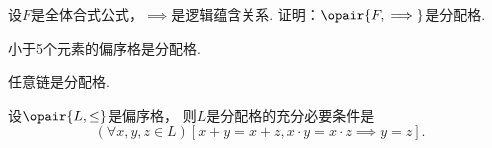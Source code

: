 \begin{example}
设\(F\)是全体合式公式，\(\implies\)是逻辑蕴含关系.
证明：\(\opair{F,\implies}\)是分配格.
\end{example}

\begin{theorem}
小于5个元素的偏序格是分配格.
\end{theorem}

\begin{theorem}
任意链是分配格.
\end{theorem}

\begin{theorem}
设\(\opair{L,\leq}\)是偏序格，
则\(L\)是分配格的充分必要条件是\[
	(\forall x,y,z \in L)
	[
		x + y = x + z,
		x \cdot y = x \cdot z
		\implies
		y = z
	].
\]
\end{theorem}
